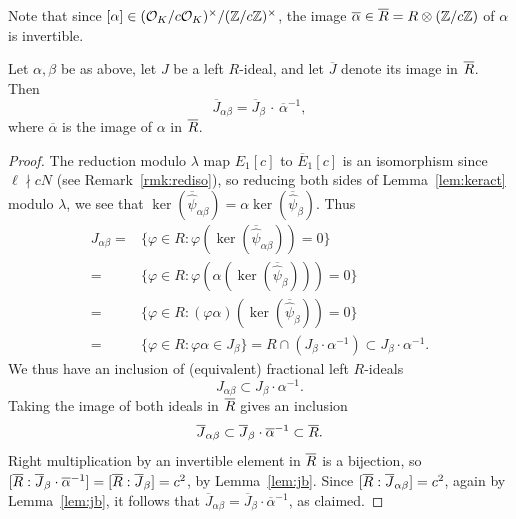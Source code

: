 \documentclass{article} \usepackage[active]{srcltx}
\renewcommand{\O}{\mathcal{O}}
\begin{document}
Note that since $[\alpha] \in (\O_K/c\O_K)^{\times}/(\Z/c\Z)^{\times}$, the image
$\overline{\alpha} \in \overline{R} = R\otimes (\mathbb{Z}/c\mathbb{Z})$ of $\alpha$ is
invertible.
\begin{proposition}\label{prop:alphabeta} 
  Let $\alpha, \beta$ be as above, let $J$ be a left $R$-ideal, and
  let $\overline{J}$ denote its image in $\overline{R}$.  Then
$$
  \overline{J}_{\alpha \beta} = \overline{J}_{\beta} \,\cdot\, \overline{\alpha}^{-1},
$$
where $\overline{\alpha}$ is the image of $\alpha$ in $\overline{R}$.
\end{proposition}
\begin{proof}
  The reduction modulo $\lambda$ map $E_1[c]$ to $\overline{E}_1[c]$
  is an isomorphism since $\ell\nmid c N$ (see Remark~\ref{rmk:rediso}), so
  reducing both sides of Lemma~\ref{lem:keract} modulo $\lambda$,
we see that 
$\ker(\overline{\hat{\psi}}_{\alpha\beta})
 = \alpha \ker(\overline{\hat{\psi}}_{\beta}).$  
Thus
\begin{align*}
J_{\alpha\beta} 
  =& \{\varphi \in R : \varphi(\ker(\overline{\hat{\psi}}_{\alpha\beta})) = 0\}\\
  =& \{\varphi \in R : \varphi(\alpha(\ker(\overline{\hat{\psi}}_{\beta}))) = 0\}\\
  =& \{\varphi \in R : (\varphi \alpha)(\ker(\overline{\hat{\psi}}_{\beta})) = 0\}\\
  =& \{\varphi \in R : \varphi \alpha \in J_{\beta}\} 
  = R \cap (J_{\beta} \cdot \alpha^{-1}) \subset J_{\beta} \cdot \alpha^{-1}.
\end{align*}
We thus have an inclusion of (equivalent) fractional left $R$-ideals
$$ 
 J_{\alpha\beta} \subset J_{\beta} \cdot \alpha^{-1}.
$$
Taking the image of both ideals in $\overline{R}$ gives an inclusion
$$
 \overline{J}_{\alpha\beta} \subset \overline{J}_{\beta} \cdot \overline{\alpha}^{-1} 
\subset \overline{R}.
$$
Right multiplication by an invertible element in $\overline{R}$ is a bijection,
so $[\overline{R} : \overline{J}_{\beta} \cdot \overline{\alpha}^{-1}] =
     [\overline{R}:\overline{J}_{\beta}] = c^2$, by Lemma~\ref{lem:jb}.
Since $[\overline{R}:\overline{J}_{\alpha\beta}] = c^2$, again
by Lemma~\ref{lem:jb}, it follows that $\overline{J}_{\alpha\beta} = 
\overline{J}_{\beta} \cdot \overline{\alpha}^{-1}$, as claimed. 

\end{proof}
\end{document}
